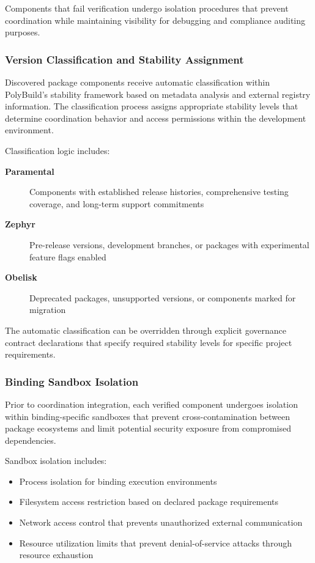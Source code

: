Components that fail verification undergo isolation procedures that prevent coordination while maintaining visibility for debugging and compliance auditing purposes.

\subsubsection{Version Classification and Stability Assignment}

Discovered package components receive automatic classification within PolyBuild's stability framework based on metadata analysis and external registry information. The classification process assigns appropriate stability levels that determine coordination behavior and access permissions within the development environment.

Classification logic includes:
\begin{description}
\item[\textbf{Paramental}] Components with established release histories, comprehensive testing coverage, and long-term support commitments
\item[\textbf{Zephyr}] Pre-release versions, development branches, or packages with experimental feature flags enabled  
\item[\textbf{Obelisk}] Deprecated packages, unsupported versions, or components marked for migration
\end{description}

The automatic classification can be overridden through explicit governance contract declarations that specify required stability levels for specific project requirements.

\subsubsection{Binding Sandbox Isolation}

Prior to coordination integration, each verified component undergoes isolation within binding-specific sandboxes that prevent cross-contamination between package ecosystems and limit potential security exposure from compromised dependencies.

Sandbox isolation includes:
\begin{itemize}
\item Process isolation for binding execution environments
\item Filesystem access restriction based on declared package requirements
\item Network access control that prevents unauthorized external communication
\item Resource utilization limits that prevent denial-of-service attacks through resource exhaustion
\end{itemize}

